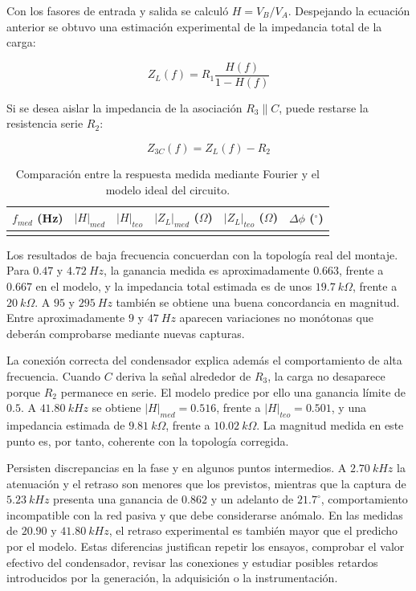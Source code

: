\documentclass[11pt,a4paper]{article}
\begin{document}
Con los fasores de entrada y salida se calculó \(H=V_B/V_A\). Despejando la ecuación anterior se obtuvo una estimación experimental de la impedancia total de la carga:

\[
Z_L(f)=R_1\frac{H(f)}{1-H(f)}
\]

Si se desea aislar la impedancia de la asociación \(R_3\parallel C\), puede restarse la resistencia serie \(R_2\):

\[
Z_{3C}(f)=Z_L(f)-R_2
\]

\begin{table}[H]
\centering
\begin{tabular}{r r r r r r}
\toprule
\(f_{med}\) (Hz) & \(|H|_{med}\) & \(|H|_{teo}\) & \(|Z_L|_{med}\) (\(\Omega\)) & \(|Z_L|_{teo}\) (\(\Omega\)) & \(\Delta\phi\) (\(^{\circ}\)) \\
\midrule
\\
\bottomrule
\end{tabular}
\caption{Comparación entre la respuesta medida mediante Fourier y el modelo ideal del circuito.}
\label{tab:resultados-medidas-impedancia}
\end{table}



Los resultados de baja frecuencia concuerdan con la topología real del montaje. Para \(0.47\) y \(4.72~Hz\), la ganancia medida es aproximadamente \(0.663\), frente a \(0.667\) en el modelo, y la impedancia total estimada es de unos \(19.7~k\Omega\), frente a \(20~k\Omega\). A \(95\) y \(295~Hz\) también se obtiene una buena concordancia en magnitud. Entre aproximadamente \(9\) y \(47~Hz\) aparecen variaciones no monótonas que deberán comprobarse mediante nuevas capturas.

La conexión correcta del condensador explica además el comportamiento de alta frecuencia. Cuando \(C\) deriva la señal alrededor de \(R_3\), la carga no desaparece porque \(R_2\) permanece en serie. El modelo predice por ello una ganancia límite de \(0.5\). A \(41.80~kHz\) se obtiene \(|H|_{med}=0.516\), frente a \(|H|_{teo}=0.501\), y una impedancia estimada de \(9.81~k\Omega\), frente a \(10.02~k\Omega\). La magnitud medida en este punto es, por tanto, coherente con la topología corregida.

Persisten discrepancias en la fase y en algunos puntos intermedios. A \(2.70~kHz\) la atenuación y el retraso son menores que los previstos, mientras que la captura de \(5.23~kHz\) presenta una ganancia de \(0.862\) y un adelanto de \(21.7^\circ\), comportamiento incompatible con la red pasiva y que debe considerarse anómalo. En las medidas de \(20.90\) y \(41.80~kHz\), el retraso experimental es también mayor que el predicho por el modelo. Estas diferencias justifican repetir los ensayos, comprobar el valor efectivo del condensador, revisar las conexiones y estudiar posibles retardos introducidos por la generación, la adquisición o la instrumentación.
\end{document}
